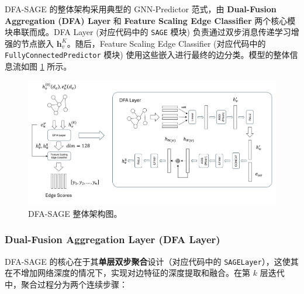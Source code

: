 \documentclass{article}
\begin{document}
DFA-SAGE 的整体架构采用典型的 GNN-Predictor 范式，由 \textbf{Dual-Fusion
Aggregation (DFA) Layer} 和 \textbf{Feature Scaling Edge Classifier}
两个核心模块串联而成。DFA Layer (对应代码中的 \texttt{SAGE} 模块) 负责通过双步消息传递学习增强的节点嵌入
$\mathbf{h}_v^K$。随后，Feature Scaling Edge Classifier (对应代码中的
\texttt{FullyConnectedPredictor} 模块) 使用这些嵌入进行最终的边分类。模型的整体信息流如图
\ref{fig:overall_architecture} 所示。

\begin{figure}[H]
  \centering
  \includegraphics[width=\textwidth]{images/DFA-SAGE-architecture.png}
  \caption{DFA-SAGE 整体架构图。}
  \label{fig:overall_architecture}
\end{figure}

\subsubsection{Dual-Fusion Aggregation Layer (DFA Layer)}

DFA-SAGE 的核心在于其\textbf{单层双步聚合}设计（对应代码中的
\texttt{SAGELayer}），这使其在不增加网络深度的情况下，实现对边特征的深度提取和融合。在第 $k$ 层迭代中，聚合过程分为两个连续步骤：
\end{document}
